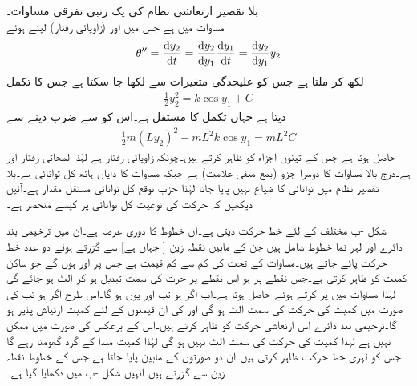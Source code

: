 \quad بلا تقصیر ارتعاشی نظام کی یک رتبی تفرقی مساوات۔\\
مساوات  میں  ہے جس میں  اور   (زاویائی رفتار) لیتے ہوئے
\begin{align*}
\theta''=\frac{\dif y_2}{\dif t}=\frac{\dif y_2}{\dif y_1}\frac{\dif y_1}{\dif t}=\frac{\dif y_2}{\dif y_1}y_2
\end{align*}
لکھ کر  ملتا ہے جس کو علیحدگی متغیرات سے  لکھا جا سکتا ہے جس کا تکمل
\begin{align}\label{مساوات_نظام_کل_توانائی_الف}
\frac{1}{2}y_2^2=k\cos y_1+C 
\end{align}
دیتا ہے جہاں  تکمل کا مستقل ہے۔اس کو  سے ضرب دینے سے
\begin{align*}
\frac{1}{2}m(Ly_2)^2-mL^2k\cos y_1=mL^2C
\end{align*}
حاصل ہوتا ہے جس کے تینوں اجزاء  کو ظاہر کرتے ہیں۔چونکہ  زاویائی رفتار ہے لہٰذا  لمحاتی رفتار اور    ہے۔درج بالا مساوات کا دوسرا جزو (بمع منفی علامت)  ہے جبکہ مساوات کا دایاں ہاتھ  کل توانائی ہے۔بلا تقصیر نظام میں توانائی کا ضیاع نہیں پایا جاتا لہٰذا حزب توقع کل توانائی مستقل مقدار ہے۔آئیں دیکھیں کہ حرکت کی نوعیت کل توانائی پر کیسے منحصر ہے۔

شکل -ب مختلف  کے لئے خط حرکت دیتی ہے۔ان خطوط کا دوری عرصہ  ہے۔ان میں ترخیمی بند دائرے اور  لہر نما خطوط شامل ہیں جن کے مابین نقطہ زین [ جہاں  ہے] سے گزرتے ہوئے دو عدد خط حرکت  پائے جاتے ہیں۔مساوات  کے تحت  کی کم سے کم قیمت  ہے جس پر  اور  ہوں گے جو ساکن کمیت کو ظاہر کرتی ہے۔جس نقطے پر  ہو اس نقطے پر حرت کی سمت تبدیل ہو کر الٹ ہو جائے گی لہٰذا مساوات  میں  پر کرتے ہوئے  حاصل ہوتا ہے۔اب اگر  ہو تب  اور یوں  ہو گا۔اس طرح اگر  ہو تب  کی صورت میں کمیت کی حرکت کی سمت الٹ ہو گی اور  کی ان قیمتوں  کے لئے کمیت ارتیاش پذیر ہو گا۔ترخیمی بند دائرے اس ارتعاشی حرکت کو ظاہر کرتے ہیں۔اس کے برعکس  کی صورت میں  ممکن نہیں ہے لہٰذا کمیت کی حرکت کی سمت الٹ نہیں ہو گی لہٰذا کمیت مبدا  کے گرد گھومتا رہے گا جس کو لہری خط حرکت ظاہر کرتی ہیں۔ان دو صورتوں کے مابین  پایا جاتا ہے جس کے خطوط نقطہ زین  سے گزرتے ہیں۔انہیں شکل -ب  میں دکھایا گیا ہے۔

